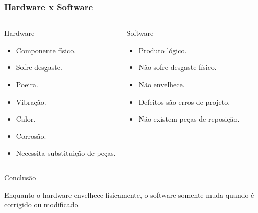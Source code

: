 \documentclass[9pt]{beamer}
\begin{document}
    \begin{frame}
    \frametitle{Hardware x Software}
    
    \begin{columns}
    
    
    \begin{block}{Hardware}
    
    \begin{itemize}
    \item Componente físico.
    \item Sofre desgaste.
    \item Poeira.
    \item Vibração.
    \item Calor.
    \item Corrosão.
    \item Necessita substituição de peças.
    \end{itemize}
    
    \end{block}
    
    
    \begin{block}{Software}
    
    \begin{itemize}
    \item Produto lógico.
    \item Não sofre desgaste físico.
    \item Não envelhece.
    \item Defeitos são erros de projeto.
    \item Não existem peças de reposição.
    \end{itemize}
    
    \end{block}
    
    \end{columns}
    
    \vspace{0.4cm}
    
    \begin{alertblock}{Conclusão}
    
    Enquanto o hardware envelhece fisicamente, o software somente muda
    quando é corrigido ou modificado.
    
    \end{alertblock}
    
    \end{frame}
    
\end{document}
